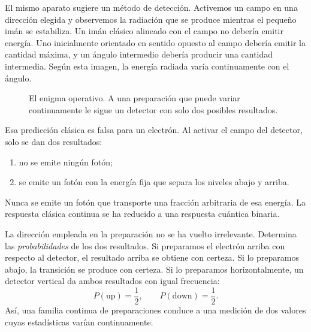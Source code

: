 El mismo aparato sugiere un método de detección. Activemos un campo en una dirección elegida y observemos la radiación que se produce mientras el pequeño imán se estabiliza. Un imán clásico alineado con el campo no debería emitir energía. Uno inicialmente orientado en sentido opuesto al campo debería emitir la cantidad máxima, y un ángulo intermedio debería producir una cantidad intermedia. Según esta imagen, la energía radiada varía continuamente con el ángulo.

\begin{figure}[htbp]
\centering
\begin{coursefitfigure}
\end{coursefitfigure}
\caption{El enigma operativo. A una preparación que puede variar continuamente le sigue un detector con solo dos posibles resultados.}
\end{figure}

Esa predicción clásica es falsa para un electrón. Al activar el campo del detector, solo se dan dos resultados:
\begin{enumerate}
  \item no se emite ningún fotón;
  \item se emite un fotón con la energía fija que separa los niveles abajo y arriba.
\end{enumerate}
Nunca se emite un fotón que transporte una fracción arbitraria de esa energía. La respuesta clásica continua se ha reducido a una respuesta cuántica binaria.

La dirección empleada en la preparación no se ha vuelto irrelevante. Determina las \emph{probabilidades} de los dos resultados. Si preparamos el electrón arriba con respecto al detector, el resultado arriba se obtiene con certeza. Si lo preparamos abajo, la transición se produce con certeza. Si lo preparamos horizontalmente, un detector vertical da ambos resultados con igual frecuencia:
\begin{equation}
  P(\text{up})=\frac12,
  \qquad
  P(\text{down})=\frac12.
  \label{eq:l02-horizontal-probabilities}
\end{equation}
Así, una familia continua de preparaciones conduce a una medición de dos valores cuyas estadísticas varían continuamente.

